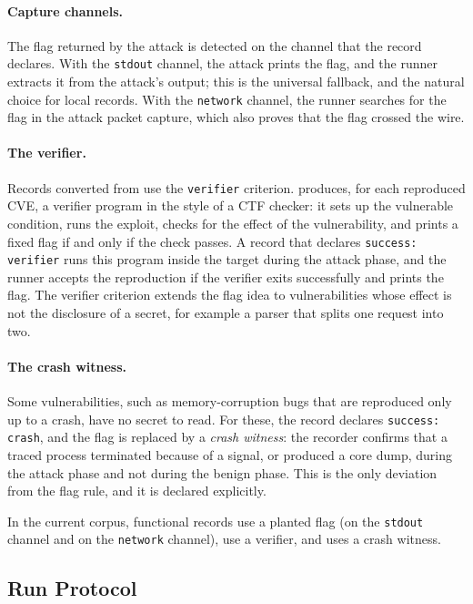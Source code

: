 \paragraph{Capture channels.}
The flag returned by the attack is detected on the channel that the record
declares. With the \texttt{stdout} channel, the attack prints the flag, and
the runner extracts it from the attack's output; this is the universal
fallback, and the natural choice for local records. With the
\texttt{network} channel, the runner searches for the flag in the attack
packet capture, which also proves that the flag crossed the wire.

\paragraph{The verifier.}
Records converted from \genie use the \texttt{verifier} criterion. \genie
produces, for each reproduced CVE, a verifier program in the style of a CTF
checker: it sets up the vulnerable condition, runs the exploit, checks for
the effect of the vulnerability, and prints a fixed flag if and only if the
check passes. A \cvexthree record that declares \texttt{success: verifier}
runs this program inside the target during the attack phase, and the runner
accepts the reproduction if the verifier exits successfully and prints the
flag. The verifier criterion extends the flag idea to vulnerabilities whose
effect is not the disclosure of a secret, for example a parser that splits
one request into two.

\paragraph{The crash witness.}
Some vulnerabilities, such as memory-corruption bugs that are reproduced only
up to a crash, have no secret to read. For these, the record declares
\texttt{success: crash}, and the flag is replaced by a \emph{crash witness}:
the recorder confirms that a traced process terminated because of a signal,
or produced a core dump, during the attack phase and not during the benign
phase. This is the only deviation from the flag rule, and it is declared
explicitly.

In the current corpus, \NumFlag functional records use a planted flag
(\NumChanStdout on the \texttt{stdout} channel and \NumChanNetwork on the
\texttt{network} channel), \NumVerifier use a \genie verifier, and
\NumCrash uses a crash witness.

\subsection{Run Protocol}

